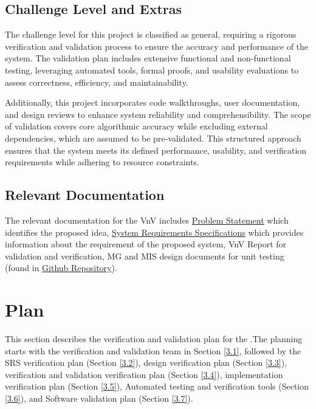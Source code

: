 \documentclass[12pt, titlepage]{article}
\begin{document}
\subsection{Challenge Level and Extras}
The challenge level for this project is classified as general, requiring a
rigorous verification and validation process to ensure the accuracy and
performance of the system. The validation plan includes extensive functional and non-functional
testing, leveraging automated tools, formal proofs, and usability evaluations to
assess correctness, efficiency, and maintainability.

Additionally, this project incorporates code walkthroughs, user documentation,
and design reviews to enhance system reliability and comprehensibility. The
scope of validation covers core algorithmic accuracy while excluding external
dependencies, which are assumed to be pre-validated. This structured approach
ensures that the system meets its defined performance, usability, and
verification requirements while adhering to resource constraints.


\subsection{Relevant Documentation}
The relevant documentation for the VnV includes
\href{https://github.com/marischan888/Computed-Tomography-Image-Reconstruction/blob/main/docs/ProblemStatementAndGoals/ProblemStatement.pdf}{Problem
  Statement} which identifies the proposed idea,
\href{https://github.com/marischan888/Computed-Tomography-Image-Reconstruction/blob/main/docs/SRS/SRS.pdf}{System
  Requirements Specifications} which provides information about the requirement
of the proposed system, VnV Report for validation and verification, MG and MIS
design documents for unit testing (found in
\href{https://github.com/marischan888/Computed-Tomography-Image-Reconstruction/tree/main/docs/Design}{Github
  Repository}).

\section{Plan} \label{sec3}
This section describes the verification and validation plan for the
\progname.The planning starts with the verification and validation team in
Section \ref{3.1}, followed by the SRS verification plan (Section \ref{3.2}),
design verification plan (Section \ref{3.3}), verification and validation
verification plan (Section \ref{3.4}), implementation verification plan (Section
\ref{3.5}), Automated testing and verification tools (Section \ref{3.6}), and
Software validation plan (Section \ref{3.7}).
\end{document}
